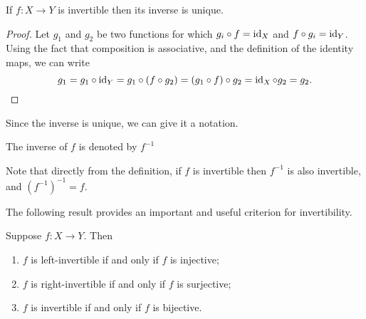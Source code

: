 \begin{proposition}
If $f:X\to Y$ is invertible then its inverse is unique.
\end{proposition}

\begin{proof}
Let $g_1$ and $g_2$ be two functions for which $g_i \circ f = \operatorname{id}_X$ and $f \circ g_i = \operatorname{id}_Y$. Using the fact that composition is associative, and the definition of the identity maps, we can write
\[ g_1 = g_1 \circ \operatorname{id}_Y = g_1 \circ (f \circ g_2) = (g_1 \circ f) \circ g_2 = \operatorname{id}_X \circ g_2 = g_2.\]
\end{proof}

Since the inverse is unique, we can give it a notation.

\begin{notation}
The inverse of $f$ is denoted by $f^{-1}$
\end{notation}

\begin{remark}
Note that directly from the definition, if $f$ is invertible then $f^{-1}$ is also invertible, and $(f^{-1})^{-1}=f$.
\end{remark}

The following result provides an important and useful criterion for invertibility.

\begin{lemma}
Suppose $f:X\to Y$. Then
\begin{enumerate}[label=(\roman*)]
\item $f$ is left-invertible if and only if $f$ is injective;
\item $f$ is right-invertible if and only if $f$ is surjective;
\item $f$ is invertible if and only if $f$ is bijective.
\end{enumerate}
\end{lemma}

